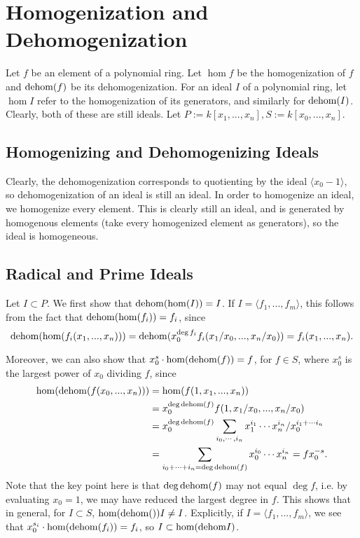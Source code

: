 
\section{Homogenization and Dehomogenization}
Let $f$ be an element of a polynomial ring. Let $\hom f$ be the homogenization of $f$ and $\mathrm{dehom}(f)$ be its dehomogenization. For an ideal $I$ of a polynomial ring, let $\hom I$ refer to the homogenization of its generators, and similarly for $\mathrm{dehom}(I)$. Clearly, both of these are still ideals. Let $P := k[x_1, ..., x_n], S := k[x_0, ..., x_n]$.

\subsection{Homogenizing and Dehomogenizing Ideals}
Clearly, the dehomogenization corresponds to quotienting by the ideal $\langle x_0 - 1 \rangle$, so dehomogenization of an ideal is still an ideal. In order to homogenize an ideal, we homogenize every element. This is clearly still an ideal, and is generated by homogenous elements (take every homogenized element as generators), so the ideal is homogeneous.

\subsection{Radical and Prime Ideals}
Let $I \subset P$. We first show that $\mathrm{dehom}(\mathrm{hom}(I)) = I$. If $I = \langle f_1, ..., f_m \rangle$, this follows from the fact that $\mathrm{dehom}(\mathrm{hom}(f_i)) = f_i$, since \[ 
\mathrm{dehom}(\mathrm{hom}(f_i(x_1, ..., x_n))) = \mathrm{dehom}(x_0^{\deg f_i} f_i(x_1/x_0, ..., x_n/x_0)) = f_i(x_1, ..., x_n).\] 

Moreover, we can also show that $x_0^s \cdot \mathrm{hom}(\mathrm{dehom}(f)) = f$, for $f \in S$, where $x_0^s$ is the largest power of $x_0$ dividing $f$, since \begin{align*}
\mathrm{hom}(\mathrm{dehom}(f(x_0, ..., x_n)) ) & = \mathrm{hom}(f(1, x_1, ..., x_n)) \\
& = x_0^{\deg \mathrm{dehom}(f)} f(1, x_1/x_0, ..., x_n/x_0) \\
& = x_0^{\deg \mathrm{dehom}(f)} \sum_{i_0, \cdots, i_n} x_1^{i_1} \cdots x_n^{i_n} / x_0^{i_1 + \cdots i_n} \\
& = \sum_{i_0 + \cdots + i_n = \deg \mathrm{dehom}(f)} x_0^{i_0} \cdots x_n^{i_n} = f x_0^{-s}.
\end{align*}
Note that the key point here is that $\deg \mathrm{dehom}(f)$ may not equal $\deg f$, i.e. by evaluating $x_0 = 1$, we may have reduced the largest degree in $f$. This shows that in general, for $I \subset S$, $\mathrm{hom}(\mathrm{dehom}()) I \neq I$. Explicitly, if $I = \langle f_1, ..., f_m\rangle$, we see that $x_0^{s_i} \cdot \mathrm{hom}(\mathrm{dehom}(f_i)) = f_i$, so $I \subset \mathrm{hom}(\mathrm{dehom} I)$.
